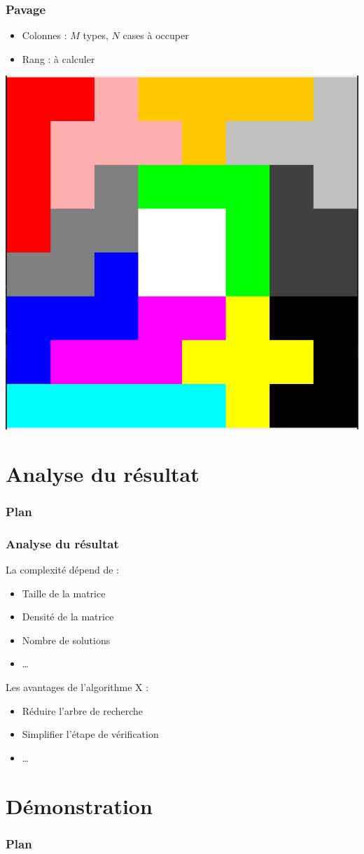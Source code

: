 \documentclass[12pt,t]{beamer}
\begin{document}
\begin{frame}
\frametitle{Pavage}
\begin{itemize}
  \item Colonnes : $M$ types, $N$ cases à occuper
  \item Rang : à calculer
\end{itemize}
\begin{center}
\includegraphics[width=.5\textwidth]{pavage.png}
\label{fig:pavage}
\end{center}
\end{frame}

\section{Analyse du résultat}

\begin{frame}
\frametitle{Plan}
\tableofcontents[currentsection]
\end{frame}

\begin{frame}
\frametitle{Analyse du résultat}
La complexité dépend de : 
\begin{itemize}
  \item Taille de la matrice
  \item Densité de la matrice
  \item Nombre de solutions
  \item \ldots
\end{itemize}
Les avantages de l'algorithme X :
\begin{itemize}
  \item Réduire l'arbre de recherche
  \item Simplifier l'étape de vérification
  \item \ldots
\end{itemize}
\end{frame}

\section{Démonstration}

\begin{frame}
\frametitle{Plan}
\tableofcontents[currentsection]
\end{frame}
\end{document}
